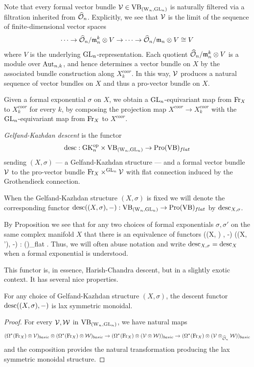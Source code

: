 \documentclass[10pt]{amsart}
\begin{document}
Note that every formal vector bundle $\mathcal{V} \in {\rm VB}_{({{\rm W}_n}, {\rm GL}_n)}$ is naturally filtered via a filtration inherited from $\widehat{\mathcal O}_n$. 
Explicitly, we see that $\mathcal{V}$ is the limit of the sequence of finite-dimensional vector spaces
\[
\cdots \to \widehat{\mathcal O}_n/{\mathfrak m}_n^k \otimes V \to \cdots \to \widehat{\mathcal O}_n/{\mathfrak m}_n \otimes V \cong V
\]
where $V$ is the underlying ${\rm GL}_n$-representation.
Each quotient $\widehat{\mathcal O}_n/{\mathfrak m}_n^k \otimes V$ is a module over ${\rm Aut}_{n,k}$, and 
hence determines a vector bundle on $X$ by the associated bundle construction along $X^{coor}_k$.
In this way, $\mathcal{V}$ produces a natural sequence of vector bundles on $X$ and thus a pro-vector bundle on $X$.

Given a formal exponential $\sigma$ on $X$, we obtain a ${\rm GL}_n$-equivariant map from ${\rm Fr}_X$ to $X^{coor}_k$ for every $k$,
by composing the projection map $X^{coor} \to X_k^{coor}$ with the ${\rm GL}_n$-equivariant map from ${\rm Fr}_X$ to $X^{coor}$.

\begin{dfn}
{\em Gelfand-Kazhdan descent} is the functor
\[
{\rm desc} : {\rm GK}_n^{{\rm op}} \times {\rm VB}_{({{\rm W}_n}, {\rm GL}_n)} \to {\rm Pro}({\rm VB})_{flat}
\]
sending $(X,\sigma)$ --- a Gelfand-Kazhdan structure
--- and a formal vector bundle $\mathcal{V}$ 
to the pro-vector bundle ${\rm Fr}_X \times^{{\rm GL}_n} \mathcal{V}$ with flat connection induced by the Grothendieck connection.
\end{dfn}

When the Gelfand-Kazhdan structure $(X, \sigma)$ is fixed we will denote the corresponding functor ${\rm desc}((X, \sigma), -) :  {\rm VB}_{({{\rm W}_n}, {\rm GL}_n)} \to {\rm Pro}({\rm VB})_{flat}$ by ${\rm desc}_{X,\sigma}$. 

By Proposition \label{gauge equiv} we see that for any two choices of formal exponentials $\sigma,\sigma'$ on the same complex manifold $X$ that there is an equivalence of functors
\ben
\desc((X, \sigma) , -) \simeq \desc((X, \sigma'), -) :  \WGLCAT \to \Pro(\VB)_{flat} .
\een
Thus, we will often abuse notation and write ${\rm desc}_{X,\sigma} = {\rm desc}_X$ when a formal exponential is understood. 

This functor is, in essence, Harish-Chandra descent, but in a slightly exotic context.
It has several nice properties.

\begin{lem}\label{prop lax}
For any choice of Gelfand-Kazhdan structure $(X,\sigma)$, the descent functor ${\rm desc}((X,\sigma),-)$ is lax symmetric monoidal.
\end{lem}

\begin{proof}
For every $\mathcal{V},\mathcal{W}$ in ${\rm VB}_{({{\rm W}_n}, {\rm GL}_n)}$, we have natural maps
\[
(\Omega^*({\rm Fr}_X) \otimes \mathcal{V})_{basic} \otimes (\Omega^*({\rm Fr}_X) \otimes \mathcal{W})_{basic} \to (\Omega^*({\rm Fr}_X) \otimes (\mathcal{V} \otimes \mathcal{W}))_{basic} \to (\Omega^*({\rm Fr}_X) \otimes (\mathcal{V} \otimes_{\widehat{\mathcal O}_n} \mathcal{W}))_{basic}
\]
and the composition provides the natural transformation producing the lax symmetric monoidal structure.
\end{proof}
\end{document}
